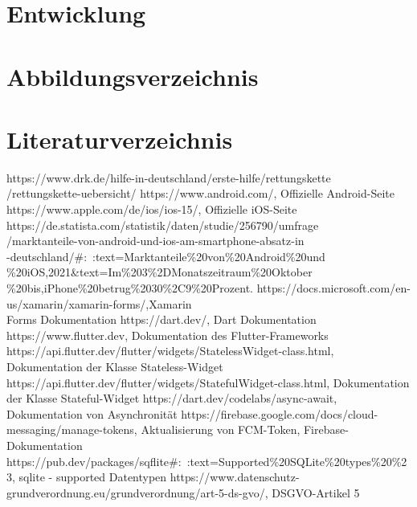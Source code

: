 \documentclass[12pt]{article}
\begin{document}



\section{Entwicklung}






\section{Abbildungsverzeichnis}
\listoffigures

\section{Literaturverzeichnis}

\begin{thebibliography}{9}
    https://www.drk.de/hilfe-in-deutschland/erste-hilfe/rettungskette\\/rettungskette-uebersicht/
    https://www.android.com/, Offizielle Android-Seite
    https://www.apple.com/de/ios/ios-15/, Offizielle iOS-Seite
    https://de.statista.com/statistik/daten/studie/256790/umfrage\\/marktanteile-von-android-und-ios-am-smartphone-absatz-in\\-deutschland/\#:~:text=Marktanteile\%20von\%20Android\%20und\\\%20iOS,2021\&text=Im\%203\%2DMonatszeitraum\%20Oktober\\\%20bis,iPhone\%20betrug\%2030\%2C9\%20Prozent.
    https://docs.microsoft.com/en-us/xamarin/xamarin-forms/,Xamarin \\Forms Dokumentation
    https://dart.dev/, Dart Dokumentation
    https://www.flutter.dev, Dokumentation des Flutter-Frameworks
    https://api.flutter.dev/flutter/widgets/StatelessWidget-class.html,\\ Dokumentation der Klasse Stateless-Widget
    https://api.flutter.dev/flutter/widgets/StatefulWidget-class.html, Dokumentation der Klasse Stateful-Widget
    https://dart.dev/codelabs/async-await, Dokumentation von Asynchronität
    https://firebase.google.com/docs/cloud-messaging/manage-tokens, Aktualisierung von FCM-Token, Firebase-Dokumentation
    https://pub.dev/packages/sqflite\#:~:text=Supported\%20SQLite\%20types\%20\%23, sqlite - supported Datentypen
    https://www.datenschutz-grundverordnung.eu/grundverordnung/art-5-ds-gvo/, DSGVO-Artikel 5
\end{thebibliography}
\end{document}

